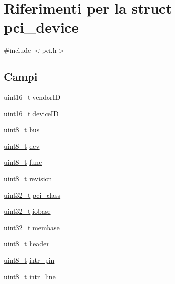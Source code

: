 \hypertarget{structpci__device}{\section{Riferimenti per la struct pci\+\_\+device}
\label{structpci__device}
}


{\ttfamily \#include $<$pci.\+h$>$}

\subsection*{Campi}
\begin{DoxyCompactItemize}
\item 
\hyperlink{aplus_8h_a5a8b2dc9e45a9ee81a94ef304fb62505}{uint16\+\_\+t} \hyperlink{structpci__device_ac9682451216985995a3601f14239dc26}{vendor\+I\+D}
\item 
\hyperlink{aplus_8h_a5a8b2dc9e45a9ee81a94ef304fb62505}{uint16\+\_\+t} \hyperlink{structpci__device_a86ce8ddd306b0395037ec7eee789a929}{device\+I\+D}
\item 
\hyperlink{aplus_8h_ae0430369c5a35dcdbc0bc19dcbb33a03}{uint8\+\_\+t} \hyperlink{structpci__device_a832940e219d52a08725a39fc97663d07}{bus}
\item 
\hyperlink{aplus_8h_ae0430369c5a35dcdbc0bc19dcbb33a03}{uint8\+\_\+t} \hyperlink{structpci__device_ae456e0d5fb85c5d367b1a4e27f996b96}{dev}
\item 
\hyperlink{aplus_8h_ae0430369c5a35dcdbc0bc19dcbb33a03}{uint8\+\_\+t} \hyperlink{structpci__device_ac292358b1097064cb388125a45740aff}{func}
\item 
\hyperlink{aplus_8h_ae0430369c5a35dcdbc0bc19dcbb33a03}{uint8\+\_\+t} \hyperlink{structpci__device_ad6450a83a220d2015cb94a9698580668}{revision}
\item 
\hyperlink{aplus_8h_a53a0df51603c77c2aa5b9ea61b606a82}{uint32\+\_\+t} \hyperlink{structpci__device_ae1867eca43c8f867951963a1753649ea}{pci\+\_\+class}
\item 
\hyperlink{aplus_8h_a53a0df51603c77c2aa5b9ea61b606a82}{uint32\+\_\+t} \hyperlink{structpci__device_a5b15ddf1741aaae55aa9933f53876d11}{iobase}
\item 
\hyperlink{aplus_8h_a53a0df51603c77c2aa5b9ea61b606a82}{uint32\+\_\+t} \hyperlink{structpci__device_a795ff4e1dc77af09805c41d96766b64b}{membase}
\item 
\hyperlink{aplus_8h_ae0430369c5a35dcdbc0bc19dcbb33a03}{uint8\+\_\+t} \hyperlink{structpci__device_ad68a4bddbd8fa989a866dccdd5035842}{header}
\item 
\hyperlink{aplus_8h_ae0430369c5a35dcdbc0bc19dcbb33a03}{uint8\+\_\+t} \hyperlink{structpci__device_a3645d371b3c45455414e4f8414e9eed8}{intr\+\_\+pin}
\item 
\hyperlink{aplus_8h_ae0430369c5a35dcdbc0bc19dcbb33a03}{uint8\+\_\+t} \hyperlink{structpci__device_a6d2298c5255e65c908f6dfdb29e4fcaf}{intr\+\_\+line}
\end{DoxyCompactItemize}


